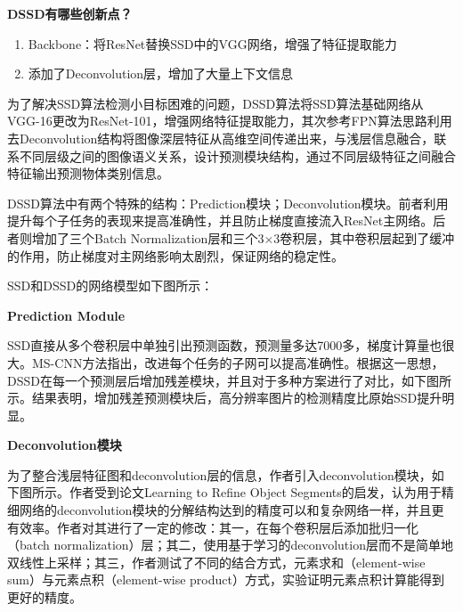 \textbf{DSSD有哪些创新点？}

\begin{enumerate}
\def\labelenumi{\arabic{enumi}.}
\item
  Backbone：将ResNet替换SSD中的VGG网络，增强了特征提取能力
\item
  添加了Deconvolution层，增加了大量上下文信息
\end{enumerate}

为了解决SSD算法检测小目标困难的问题，DSSD算法将SSD算法基础网络从VGG-16更改为ResNet-101，增强网络特征提取能力，其次参考FPN算法思路利用去Deconvolution结构将图像深层特征从高维空间传递出来，与浅层信息融合，联系不同层级之间的图像语义关系，设计预测模块结构，通过不同层级特征之间融合特征输出预测物体类别信息。

DSSD算法中有两个特殊的结构：Prediction模块；Deconvolution模块。前者利用提升每个子任务的表现来提高准确性，并且防止梯度直接流入ResNet主网络。后者则增加了三个Batch
Normalization层和三个3×3卷积层，其中卷积层起到了缓冲的作用，防止梯度对主网络影响太剧烈，保证网络的稳定性。

SSD和DSSD的网络模型如下图所示：

\begin{figure}
\centering
\caption{}
\end{figure}

\textbf{Prediction Module}

SSD直接从多个卷积层中单独引出预测函数，预测量多达7000多，梯度计算量也很大。MS-CNN方法指出，改进每个任务的子网可以提高准确性。根据这一思想，DSSD在每一个预测层后增加残差模块，并且对于多种方案进行了对比，如下图所示。结果表明，增加残差预测模块后，高分辨率图片的检测精度比原始SSD提升明显。

\begin{figure}
\centering
\caption{}
\end{figure}

\textbf{Deconvolution模块}

为了整合浅层特征图和deconvolution层的信息，作者引入deconvolution模块，如下图所示。作者受到论文Learning
to Refine Object
Segments的启发，认为用于精细网络的deconvolution模块的分解结构达到的精度可以和复杂网络一样，并且更有效率。作者对其进行了一定的修改：其一，在每个卷积层后添加批归一化（batch
normalization）层；其二，使用基于学习的deconvolution层而不是简单地双线性上采样；其三，作者测试了不同的结合方式，元素求和（element-wise
sum）与元素点积（element-wise
product）方式，实验证明元素点积计算能得到更好的精度。

